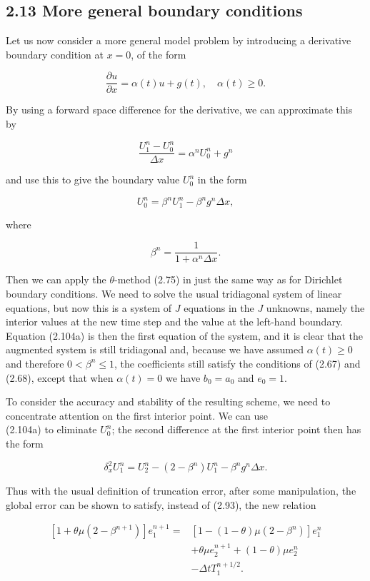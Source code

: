 \documentclass[10pt]{article}
\begin{document}
\subsection*{2.13 More general boundary conditions}
Let us now consider a more general model problem by introducing a derivative boundary condition at \(x=0\), of the form

\[
\frac{\partial u}{\partial x}=\alpha(t) u+g(t), \quad \alpha(t) \geq 0 .
\]

By using a forward space difference for the derivative, we can approximate this by

\[
\frac{U_{1}^{n}-U_{0}^{n}}{\Delta x}=\alpha^{n} U_{0}^{n}+g^{n}
\]

and use this to give the boundary value \(U_{0}^{n}\) in the form

\[
U_{0}^{n}=\beta^{n} U_{1}^{n}-\beta^{n} g^{n} \Delta x,
\]

where

\[
\beta^{n}=\frac{1}{1+\alpha^{n} \Delta x} .
\]

Then we can apply the \(\theta\)-method (2.75) in just the same way as for Dirichlet boundary conditions. We need to solve the usual tridiagonal system of linear equations, but now this is a system of \(J\) equations in the \(J\) unknowns, namely the interior values at the new time step and the value at the left-hand boundary. Equation (2.104a) is then the first equation of the system, and it is clear that the augmented system is still tridiagonal and, because we have assumed \(\alpha(t) \geq 0\) and therefore \(0<\beta^{n} \leq 1\), the coefficients still satisfy the conditions of (2.67) and (2.68), except that when \(\alpha(t)=0\) we have \(b_{0}=a_{0}\) and \(e_{0}=1\).

To consider the accuracy and stability of the resulting scheme, we need to concentrate attention on the first interior point. We can use\\
(2.104a) to eliminate \(U_{0}^{n}\); the second difference at the first interior point then has the form

\[
\delta_{x}^{2} U_{1}^{n}=U_{2}^{n}-\left(2-\beta^{n}\right) U_{1}^{n}-\beta^{n} g^{n} \Delta x .
\]

Thus with the usual definition of truncation error, after some manipulation, the global error can be shown to satisfy, instead of (2.93), the new relation

\[
\begin{aligned}
{\left[1+\theta \mu\left(2-\beta^{n+1}\right)\right] e_{1}^{n+1}=} & {\left[1-(1-\theta) \mu\left(2-\beta^{n}\right)\right] e_{1}^{n} } \\
& +\theta \mu e_{2}^{n+1}+(1-\theta) \mu e_{2}^{n} \\
& -\Delta t T_{1}^{n+1 / 2} .
\end{aligned}
\]
\end{document}
